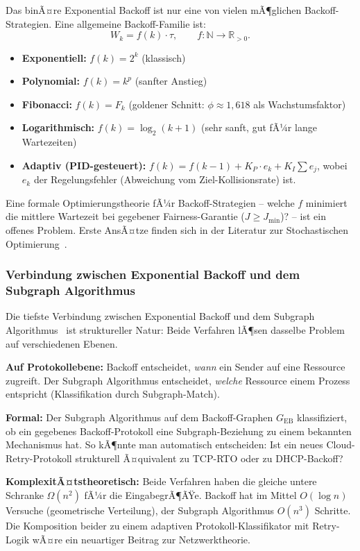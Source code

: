 ﻿\documentclass[a4paper,12pt]{article}
\theoremstyle{definition}
\begin{document}
Das binÃ¤re Exponential Backoff ist nur eine von vielen
mÃ¶glichen Backoff-Strategien. Eine allgemeine Backoff-Familie
ist:
\[
  W_k = f(k) \cdot \tau, \qquad f: \mathbb{N} \to \mathbb{R}_{> 0}.
\]
\begin{itemize}
  \item \textbf{Exponentiell:} $f(k) = 2^k$ (klassisch)
  \item \textbf{Polynomial:} $f(k) = k^p$ (sanfter Anstieg)
  \item \textbf{Fibonacci:} $f(k) = F_k$ (goldener Schnitt:
        $\phi \approx 1{,}618$ als Wachstumsfaktor)
  \item \textbf{Logarithmisch:} $f(k) = \log_2(k+1)$
        (sehr sanft, gut fÃ¼r lange Wartezeiten)
  \item \textbf{Adaptiv (PID-gesteuert):}
        $f(k) = f(k-1) + K_P \cdot e_k + K_I \sum e_j$,
        wobei $e_k$ der Regelungsfehler (Abweichung vom
        Ziel-Kollisionsrate) ist.
\end{itemize}

Eine formale Optimierungstheorie fÃ¼r Backoff-Strategien --
welche $f$ minimiert die mittlere Wartezeit bei gegebener
Fairness-Garantie ($J \geq J_{\min}$)? -- ist ein
offenes Problem. Erste AnsÃ¤tze finden sich in der
Literatur zur Stochastischen Optimierung~\cite{spall2003introduction}.

\subsubsection{Verbindung zwischen Exponential Backoff und
dem Subgraph Algorithmus}

Die tiefste Verbindung zwischen Exponential Backoff und dem
Subgraph Algorithmus~\cite{epp2026subgraph} ist struktureller
Natur: Beide Verfahren lÃ¶sen dasselbe Problem auf
verschiedenen Ebenen.

\textbf{Auf Protokollebene:} Backoff entscheidet, \emph{wann}
ein Sender auf eine Ressource zugreift.
Der Subgraph Algorithmus entscheidet, \emph{welche} Ressource
einem Prozess entspricht (Klassifikation durch Subgraph-Match).

\textbf{Formal:} Der Subgraph Algorithmus auf dem
Backoff-Graphen $G_{\mathrm{EB}}$ klassifiziert, ob ein
gegebenes Backoff-Protokoll eine Subgraph-Beziehung zu einem
bekannten Mechanismus hat. So kÃ¶nnte man automatisch
entscheiden: Ist ein neues Cloud-Retry-Protokoll strukturell
Ã¤quivalent zu TCP-RTO oder zu DHCP-Backoff?

\textbf{KomplexitÃ¤tstheoretisch:} Beide Verfahren haben die
gleiche untere Schranke $\Omega(n^2)$ fÃ¼r die EingabegrÃ¶ÃŸe.
Backoff hat im Mittel $O(\log n)$ Versuche (geometrische
Verteilung), der Subgraph Algorithmus $O(n^3)$ Schritte.
Die Komposition beider zu einem adaptiven Protokoll-Klassifikator
mit Retry-Logik wÃ¤re ein neuartiger Beitrag zur
Netzwerktheorie.
\end{document}
